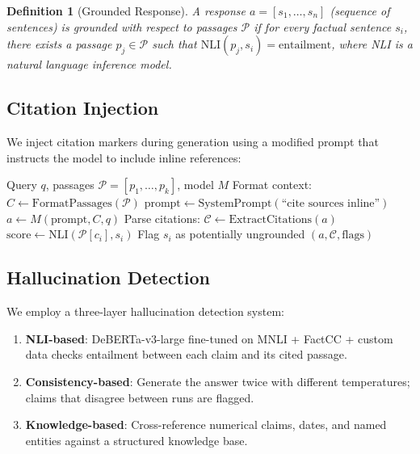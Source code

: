 \documentclass[11pt,twocolumn]{article}
\newtheorem{definition}{Definition}
\begin{document}
\begin{definition}[Grounded Response]
A response $a = [s_1, \ldots, s_n]$ (sequence of sentences) is \emph{grounded} with respect to passages $\mathcal{P}$ if for every factual sentence $s_i$, there exists a passage $p_j \in \mathcal{P}$ such that $\text{NLI}(p_j, s_i) = \text{entailment}$, where NLI is a natural language inference model.
\end{definition}

\subsection{Citation Injection}

We inject citation markers during generation using a modified prompt that instructs the model to include inline references:

\begin{algorithm}[H]
\caption{Grounded Generation with Citation Injection}
\label{alg:grounded}
\begin{algorithmic}[1]
\Require Query $q$, passages $\mathcal{P} = [p_1, \ldots, p_k]$, model $M$
\State Format context: $C \gets \text{FormatPassages}(\mathcal{P})$
\State $\text{prompt} \gets \text{SystemPrompt}(\text{``cite sources inline''})$
\State $a \gets M(\text{prompt}, C, q)$ 
\State Parse citations: $\mathcal{C} \gets \text{ExtractCitations}(a)$
\State {}
    \State $\text{score} \gets \text{NLI}(\mathcal{P}[c_i], s_i)$
        \State Flag $s_i$ as potentially ungrounded
    \EndIf
\EndFor
\State \Return $(a, \mathcal{C}, \text{flags})$
\end{algorithmic}
\end{algorithm}

\subsection{Hallucination Detection}

We employ a three-layer hallucination detection system:

\begin{enumerate}[leftmargin=1.4em]
    \item \textbf{NLI-based}: DeBERTa-v3-large fine-tuned on MNLI + FactCC + custom data checks entailment between each claim and its cited passage.
    \item \textbf{Consistency-based}: Generate the answer twice with different temperatures; claims that disagree between runs are flagged.
    \item \textbf{Knowledge-based}: Cross-reference numerical claims, dates, and named entities against a structured knowledge base.
\end{enumerate}
\end{document}
